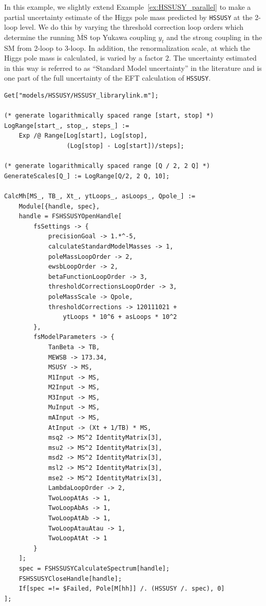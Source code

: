 \documentclass[final,3p,11pt,pdflatex]{elsarticle}
\makeatletter
\newcommand{\modelname}[1]{\texttt{#1}\@\xspace}
\newcommand{\HSSUSY}{\modelname{HSSUSY}}
\newcommand{\ol}[1]{\overline{#1}}
\newcommand{\MSbar}{\ensuremath{\ol{\text{MS}}}\xspace}
\newcommand{\exref}[1]{Example~\ref{#1}}
\makeatother
\begin{document}
\begin{example}[label=ex:HSSUSY_uncertainty]
  In this example, we slightly extend \exref{ex:HSSUSY_parallel}
  to make a partial uncertainty estimate of the Higgs pole
  mass predicted by \HSSUSY at the 2-loop level.  We do this by varying the
  threshold correction loop orders which determine the running \MSbar
  top Yukawa coupling
  $y_t$ and the strong coupling in the SM from 2-loop to
  3-loop.  In addition, the renormalization scale,
  at which the Higgs pole mass is calculated,
  is varied by a factor $2$.  The uncertainty
  estimated in this way is referred to as ``Standard Model
  uncertainty'' in the literature \cite{Vega:2015fna,Athron:2016fuq}
  and is one part of the full uncertainty of the EFT calculation
  of \HSSUSY.
  \begin{lstlisting}
Get["models/HSSUSY/HSSUSY_librarylink.m"];

(* generate logarithmically spaced range [start, stop] *)
LogRange[start_, stop_, steps_] :=
    Exp /@ Range[Log[start], Log[stop],
                 (Log[stop] - Log[start])/steps];

(* generate logarithmically spaced range [Q / 2, 2 Q] *)
GenerateScales[Q_] := LogRange[Q/2, 2 Q, 10];

CalcMh[MS_, TB_, Xt_, ytLoops_, asLoops_, Qpole_] :=
    Module[{handle, spec},
    handle = FSHSSUSYOpenHandle[
        fsSettings -> {
            precisionGoal -> 1.*^-5,
            calculateStandardModelMasses -> 1,
            poleMassLoopOrder -> 2,
            ewsbLoopOrder -> 2,
            betaFunctionLoopOrder -> 3,
            thresholdCorrectionsLoopOrder -> 3,
            poleMassScale -> Qpole,
            thresholdCorrections -> 120111021 +
                ytLoops * 10^6 + asLoops * 10^2
        },
        fsModelParameters -> {
            TanBeta -> TB,
            MEWSB -> 173.34,
            MSUSY -> MS,
            M1Input -> MS,
            M2Input -> MS,
            M3Input -> MS,
            MuInput -> MS,
            mAInput -> MS,
            AtInput -> (Xt + 1/TB) * MS,
            msq2 -> MS^2 IdentityMatrix[3],
            msu2 -> MS^2 IdentityMatrix[3],
            msd2 -> MS^2 IdentityMatrix[3],
            msl2 -> MS^2 IdentityMatrix[3],
            mse2 -> MS^2 IdentityMatrix[3],
            LambdaLoopOrder -> 2,
            TwoLoopAtAs -> 1,
            TwoLoopAbAs -> 1,
            TwoLoopAtAb -> 1,
            TwoLoopAtauAtau -> 1,
            TwoLoopAtAt -> 1
        }
    ];
    spec = FSHSSUSYCalculateSpectrum[handle];
    FSHSSUSYCloseHandle[handle];
    If[spec =!= $Failed, Pole[M[hh]] /. (HSSUSY /. spec), 0]
];


\end{lstlisting}
\end{example}
\end{document}
